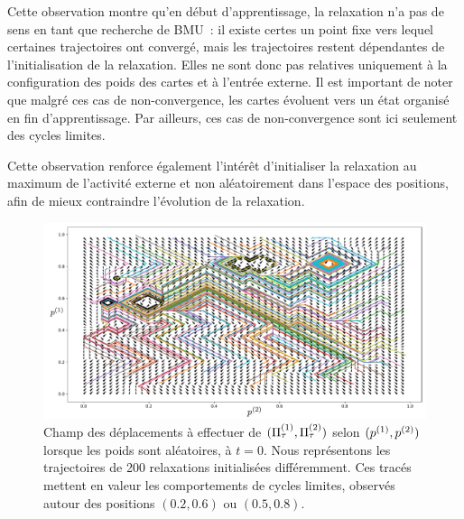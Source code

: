 \documentclass[../main]{subfiles}
\begin{document}
Cette observation montre qu'en début d'apprentissage, la relaxation n'a pas de sens en tant que recherche de BMU~: il existe certes un point fixe vers lequel certaines trajectoires ont convergé, mais les trajectoires restent dépendantes de l'initialisation de la relaxation. 
Elles ne sont donc pas relatives uniquement à la configuration des poids des cartes et à l'entrée externe.
Il est important de noter que malgré ces cas de non-convergence, les cartes évoluent vers un état organisé en fin d'apprentissage. Par ailleurs, ces cas de non-convergence sont ici seulement des cycles limites.

Cette observation renforce également l'intérêt d'initialiser la relaxation au maximum de l'activité externe et non aléatoirement dans l'espace des positions, afin de mieux contraindre l'évolution de la relaxation.

	\begin{figure}
		\centering
		\includegraphics[width=\textwidth]{champ_006_t1.pdf}
		\caption{Champ des déplacements à effectuer de $(\Pi^{({1})}_\tau, \Pi^{({2})}_\tau)$ selon $(p^{({1})}, p^{({2})})$ lorsque les poids sont aléatoires, à $t=0$. Nous représentons les trajectoires de 200 relaxations initialisées différemment. Ces tracés mettent en valeur les comportements de cycles limites, observés autour des positions $(0.2, 0.6)$ ou $(0.5, 0.8)$.}
		\label{fig:champ_0}
		\end{figure}
		
\end{document}
